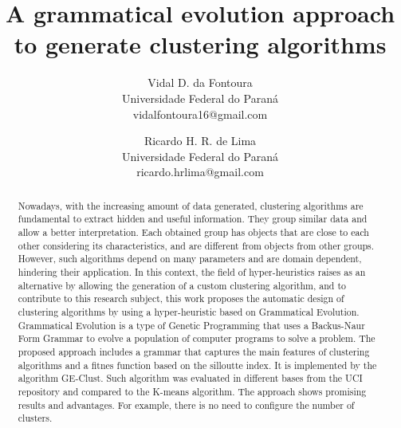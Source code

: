 \documentclass[conference,compsoc]{IEEEtran}
\begin{document}
	
\title{A grammatical evolution approach to generate clustering algorithms}


\author{
Vidal D. da Fontoura\\
Universidade Federal do Paraná\\
vidalfontoura16@gmail.com\\
\and
Ricardo H. R. de Lima\\
Universidade Federal do Paraná\\
ricardo.hrlima@gmail.com\\
}


\maketitle

\begin{abstract}
	
	
	Nowadays, with the increasing amount of data generated, clustering algorithms are fundamental to extract hidden and useful information. They group similar data and allow a better interpretation. Each obtained group has objects that are close to each other considering its characteristics, and are different from objects from other groups. However, such algorithms depend on many parameters and are domain dependent, hindering their application. In this context, the field of hyper-heuristics raises as an alternative by allowing the generation of a custom clustering algorithm, and to contribute to this research subject, this work proposes the automatic design of clustering algorithms by using a hyper-heuristic based on Grammatical Evolution. Grammatical Evolution is a type of Genetic Programming that uses a Backus-Naur Form Grammar to evolve a population of computer programs to solve a problem. The proposed approach includes a grammar that captures the main features of clustering algorithms and a fitnes function based on the silloutte index. It is implemented by the algorithm GE-Clust. Such algorithm was evaluated in different bases from the UCI repository and compared to the K-means algorithm. The approach  shows promising results  and advantages. For example, there is no need to configure the number of clusters.
	
\end{abstract}

\end{document}
